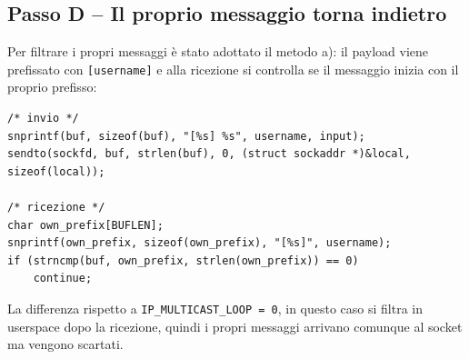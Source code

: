 \documentclass[a4paper,12pt]{article}
\begin{document}
\subsection*{Passo D -- Il proprio messaggio torna indietro}

Per filtrare i propri messaggi è stato adottato
il metodo a): il payload viene prefissato con \texttt{[username]} e alla ricezione
si controlla se il messaggio inizia con il proprio prefisso:

\begin{lstlisting}
/* invio */
snprintf(buf, sizeof(buf), "[%s] %s", username, input);
sendto(sockfd, buf, strlen(buf), 0, (struct sockaddr *)&local, sizeof(local));

/* ricezione */
char own_prefix[BUFLEN];
snprintf(own_prefix, sizeof(own_prefix), "[%s]", username);
if (strncmp(buf, own_prefix, strlen(own_prefix)) == 0)
    continue;
\end{lstlisting}

La differenza rispetto a \texttt{IP\_MULTICAST\_LOOP = 0}, in questo caso si
filtra in userspace dopo la ricezione, quindi i propri messaggi arrivano comunque al
socket ma vengono scartati.
\end{document}
